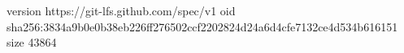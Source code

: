 version https://git-lfs.github.com/spec/v1
oid sha256:3834a9b0e0b38eb226ff276502ccf2202824d24a6d4cfe7132ce4d534b616151
size 43864

